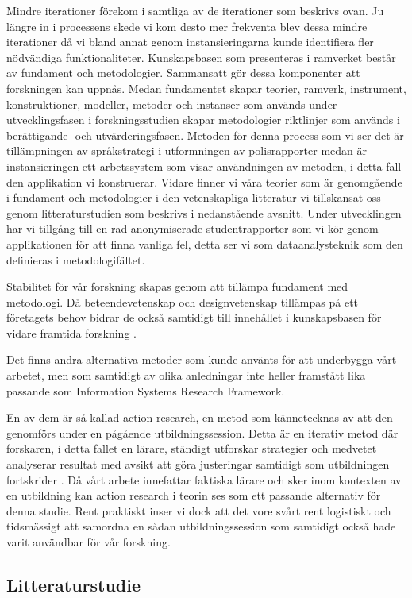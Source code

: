 \documentclass[swedish]{maucsthesis}
\begin{document}
Mindre iterationer förekom i samtliga av de iterationer som beskrivs ovan. Ju
längre in i processens skede vi kom desto mer frekventa blev dessa mindre
iterationer då vi bland annat genom instansieringarna kunde identifiera fler
nödvändiga funktionaliteter. Kunskapsbasen som presenteras i ramverket består av
fundament och metodologier. Sammansatt gör dessa komponenter att forskningen kan
uppnås. Medan fundamentet skapar teorier, ramverk, instrument, konstruktioner,
modeller, metoder och instanser som används under utvecklingsfasen i
forskningsstudien skapar metodologier riktlinjer som används i berättigande- och
utvärderingsfasen. Metoden för denna process som vi ser det är tillämpningen av
språkstrategi i utformningen av polisrapporter medan är instansieringen ett
arbetssystem som visar användningen av metoden, i detta fall den applikation vi
konstruerar. Vidare finner vi våra teorier som är genomgående i fundament och
metodologier i den vetenskapliga litteratur vi tillskansat oss genom
litteraturstudien som beskrivs i nedanstående avsnitt. Under utvecklingen har vi
tillgång till en rad anonymiserade studentrapporter som vi kör genom
applikationen för att finna vanliga fel, detta ser vi som dataanalysteknik som
den definieras i metodologifältet.

Stabilitet för vår forskning skapas genom att tillämpa fundament med metodologi.
Då beteendevetenskap och designvetenskap tillämpas på ett företagets behov
bidrar de också samtidigt till innehållet i kunskapsbasen för vidare framtida
forskning \cite{hevner:2004}.

Det finns andra alternativa metoder som kunde använts för att underbygga vårt
arbetet, men som samtidigt av olika anledningar inte heller framstått lika
passande som Information Systems Research Framework.

En av dem är så kallad action research, en metod som kännetecknas av att den
genomförs under en pågående utbildningssession. Detta är en iterativ metod där
forskaren, i detta fallet en lärare, ständigt utforskar strategier och medvetet
analyserar resultat med avsikt att göra justeringar samtidigt som utbildningen
fortskrider \citep{clement:2004}. Då vårt arbete innefattar faktiska lärare och
sker inom kontexten av en utbildning kan action research i teorin ses som ett
passande alternativ för denna studie. Rent praktiskt inser vi dock att det vore
svårt rent logistiskt och tidsmässigt att samordna en sådan utbildningssession
som samtidigt också hade varit användbar för vår forskning.

\subsection{Litteraturstudie}
\end{document}
